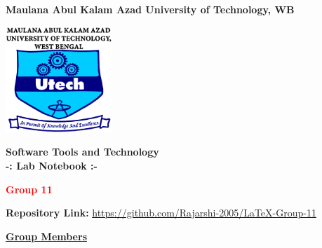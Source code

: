 \documentclass[a4paper,12pt]{article}
\begin{document}
\begin{titlepage}
    \centering
    \vspace*{0 cm}
    \LARGE
    \textbf{Maulana Abul Kalam Azad University of Technology, WB}
    \vspace{0.5cm}
    
    \includegraphics[width=0.3\textwidth]{makaut1.png} %
    \vspace{0.5cm}
    
    \Large
    \textbf{\textcolor{blue!60}{Software Tools and Technology\\
        -: Lab Notebook :-}}
    \vspace{0.5cm}
    
    \large
    \textbf{\textcolor{red}{Group 11}}
    \vspace{0.5 cm}
    
    \textbf{Repository Link:} \href{https://github.com/Rajarshi-2005/LaTeX-Group-11}{https://github.com/Rajarshi-2005/LaTeX-Group-11}
    \vspace{0.5cm}
    
    \textbf{\underline{\textcolor{blue!60}{Group Members}}}
    \vspace{0.4cm}


\end{titlepage}
\end{document}
